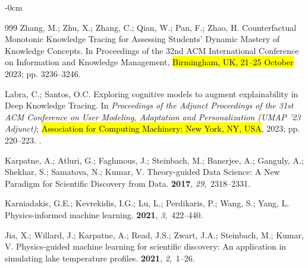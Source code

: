 \documentclass[applsci,article,accept,moreauthors,pdftex]{Definitions/mdpi}
\begin{document}
\begin{adjustwidth}{-\extralength}{0cm}
\begin{thebibliography}{999}
Zhang, M.; Zhu, X.; Zhang, C.; Qian, W.; Pan, F.; Zhao, H.
\newblock Counterfactual Monotonic Knowledge Tracing for Assessing Students'
  Dynamic Mastery of Knowledge Concepts.
\newblock In Proceedings of the 32nd ACM International
  Conference on Information and Knowledge Management, \hl{Birmingham, UK, 21--25 October} 2023; pp. 3236--3246.

Labra, C.; Santos, O.C.
\newblock Exploring cognitive models to augment explainability in Deep
  Knowledge Tracing.
\newblock In \textit{Proceedings of the Adjunct Proceedings of the 31st ACM Conference
  on User Modeling, Adaptation and Personalization (UMAP '23 Adjunct)}; \hl{Association for Computing Machinery: New York, NY, USA},  2023;
  pp. 220--223.
.



Karpatne, A.; Atluri, G.; Faghmous, J.; Steinbach, M.; Banerjee, A.; Ganguly,
  A.; Shekhar, S.; Samatova, N.; Kumar, V.
\newblock Theory-guided Data Science: A New Paradigm for Scientific Discovery
  from Data.
 {\bf 2017},
  {\em 29},~2318--2331.

Karniadakis, G.E.; Kevrekidis, I.G.; Lu, L.; Perdikaris, P.; Wang, S.; Yang, L.
\newblock Physics-informed machine learning.
 {\bf 2021}, {\em 3},~422--440.

Jia, X.; Willard, J.; Karpatne, A.; Read, J.S.; Zwart, J.A.; Steinbach, M.;
  Kumar, V.
\newblock Physics-guided machine learning for scientific discovery: An
  application in simulating lake temperature profiles.
 {\bf 2021}, {\em
  2},~1--26.


\end{thebibliography}
\end{adjustwidth}
\end{document}

